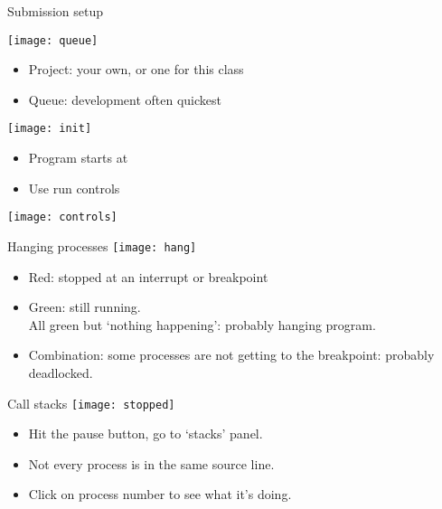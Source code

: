 \documentclass[11pt,headernav]{beamer}
\begin{document}
\begin{frame}[containsverbatim]{Submission setup}
  \begin{multicols}{2}
    \texttt{[image: queue]}
    \columnbreak
    \begin{itemize}
    \item Project: your own, or one for this class
    \item Queue: development often quickest
    \end{itemize}
  \end{multicols}
\end{frame}

\begin{frame}[containsverbatim]{}
  \texttt{[image: init]}
  \begin{itemize}
  \item Program starts at 
  \item Use run controls
  \end{itemize}
\texttt{[image: controls]}
\end{frame}

\begin{frame}[containsverbatim]{Hanging processes}
  \texttt{[image: hang]}
  \begin{itemize}
  \item Red: stopped at an interrupt or breakpoint
  \item Green: still running.\\
    All green but `nothing happening': probably hanging program.
  \item Combination: some processes are not getting to the breakpoint:
    probably deadlocked.
  \end{itemize}
\end{frame}

\begin{frame}[containsverbatim]{Call stacks}
  \texttt{[image: stopped]}
  \begin{itemize}
  \item Hit the pause button, go to `stacks' panel.
  \item Not every process is in the same source line.
  \item Click on process number to see what it's doing.
  \end{itemize}
\end{frame}
\end{document}

